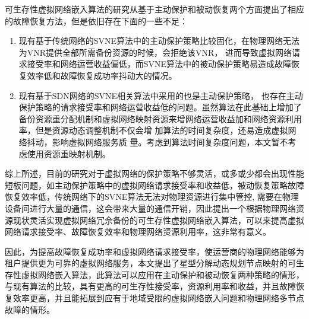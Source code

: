 可生存性虚拟网络嵌入算法的研究从基于主动保护和被动恢复两个方面提出了相应的故障恢复方法，但是依旧存在下面的一些不足：
\begin{enumerate}
  \item 现有基于传统网络的SVNE算法中的主动保护策略比较固化，在物理网络无法为VNR提供全部所需备份资源的时候，会拒绝该VNR， 进而导致虚拟网络请求接受率和网络运营收益偏低，而SVNE算法中的被动保护策略易造成故障恢复效率低和故障恢复成功率抖动大的情况。
  \item 现有基于SDN网络的SVNE相关算法中采用的也是主动保护策略， 也存在主动保护策略的请求接受率和网络运营收益低的问题。虽然算法在此基础上增加了备份资源重分配机制\cite{yu2008rethinking}和虚拟网络映射资源来增网络运营收益加和网络资源利用率，但是资源动态调整机制不仅会增 加算法的时间复杂度，还易造成虚拟网络抖动，影响虚拟网络服务质 量。考虑到算法时间复杂度问题，本文暂不考虑使用资源重映射机制。
\end{enumerate}

综上所述，目前的研究对于虚拟网络的保护策略不够灵活，或多或少都会出现性能短板问题，如主动保护策略中的虚拟网络请求接受率和收益低，被动恢复策略故障恢复效率低，传统网络下的SVNE算法无法对物理资源进行集中管控, 需要在物理设备间进行大量的通信，这会带来大量的通信开销，因此提出一个根据物理网络资源现状灵活实现虚拟网络冗佘备份的可生存性虚拟网络嵌入算法，可以来提高虚拟网络请求接受率、故障恢复效率和物理网络资源利用率，这非常有意义。

因此，为提高故障恢复成功率和虚拟网络请求接受率，使运营商的物理网络能够为租户提供更为可靠的虚拟网络服务，本文提出了星型分解动态规划节点映射的可生存性虚拟网络嵌入算法，此算法可以应用在主动保护和被动恢复两种策略的情形，与现有算法的比较，具有更高的可生存性接受率，资源利用率和收益，并且故障恢复效率更高，并且能拓展到应有于地域受限的虚拟网络嵌入问题和物理网络多节点故障的情形。




